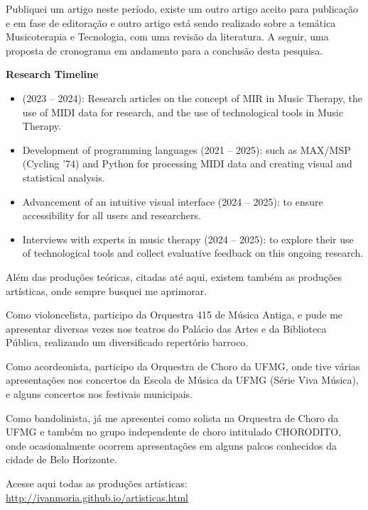 \documentclass[a4paper,12pt]{article}
\begin{document}
\begin{doublespace}
\medskip
Publiquei um artigo neste período, existe um outro artigo aceito para publicação e em fase de editoração e outro artigo está sendo realizado sobre a temática Musicoterapia e Tecnologia, com uma revisão da literatura. A seguir, uma proposta de cronograma em andamento para a conclusão desta pesquisa.

\medskip
\textbf{Research Timeline}

\begin{itemize}[leftmargin=*, label={--}]
    \item (2023 – 2024): Research articles on the concept of MIR in Music Therapy, the use of MIDI data for research, and the use of technological tools in Music Therapy.
    \item Development of programming languages (2021 – 2025): such as MAX/MSP (Cycling ’74) and Python for processing MIDI data and creating visual and statistical analysis.
    \item Advancement of an intuitive visual interface (2024 – 2025): to ensure accessibility for all users and researchers.
    \item Interviews with experts in music therapy (2024 – 2025): to explore their use of technological tools and collect evaluative feedback on this ongoing research.
\end{itemize}

\medskip
Além das produções teóricas, citadas até aqui, existem também as produções artísticas, onde sempre busquei me aprimorar.

\medskip
Como violoncelista, participo da Orquestra 415 de Música Antiga, e pude me apresentar diversas vezes nos teatros do Palácio das Artes e da Biblioteca Pública, realizando um diversificado repertório barroco.

\medskip
Como acordeonista, participo da Orquestra de Choro da UFMG, onde tive várias apresentações nos concertos da Escola de Música da UFMG (Série Viva Música), e alguns concertos nos festivais municipais.

\medskip
Como bandolinista, já me apresentei como solista na Orquestra de Choro da UFMG e também no grupo independente de choro intitulado CHORODITO, onde ocasionalmente ocorrem apresentações em alguns palcos conhecidos da cidade de Belo Horizonte.

\medskip
Acesse aqui todas as produções artísticas: \url{http://ivanmoria.github.io/artisticas.html}

\end{doublespace}
\end{document}
